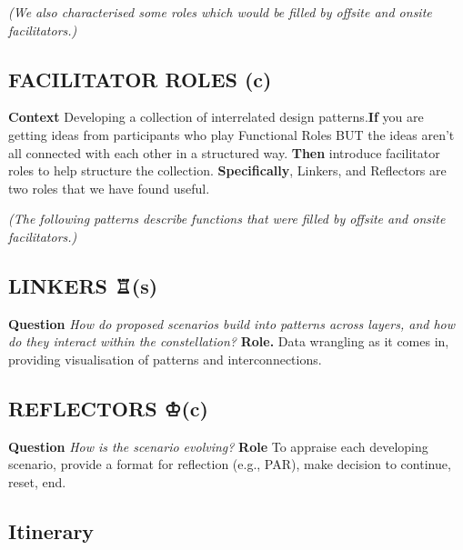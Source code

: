 \documentclass[acmlarge,timestamp]{acmart}
\newcommand{\sensory}{(s)}
\newcommand{\cognitive}{(c)}
\begin{document}
\smallskip

\noindent \emph{(We also characterised some roles which would be
filled by offsite and onsite facilitators.)}

\subsection*{FACILITATOR ROLES {\hfill \cognitive}}
\textbf{Context} Developing a collection of interrelated design
patterns.\newline \textbf{If} you are getting ideas from participants
who play {\sc Functional Roles} BUT the ideas aren’t all connected
with each other in a structured way.\newline
\textbf{Then} introduce
facilitator roles to help structure the collection.\newline
\textbf{Specifically}, {\sc Linkers}, and {\sc Reflectors} are two
roles that we have found useful.

\emph{(The following patterns describe functions that were filled by
offsite and onsite facilitators.)}

\subsection*{LINKERS {\chess ♖}{\hfill \sensory}}

\textbf{Question}
\emph{How do proposed scenarios build into patterns across layers, and how do they interact within the constellation?}\newline
\textbf{Role.} Data wrangling as it comes in, providing visualisation of patterns and interconnections.

\subsection*{REFLECTORS {\chess ♔}{\hfill \cognitive}}

\textbf{Question} \emph{How is the scenario evolving?}\newline
\textbf{Role} To appraise each developing scenario, provide a format for reflection (e.g., PAR), make decision to continue, reset, end.

\subsection{Itinerary}
\end{document}
